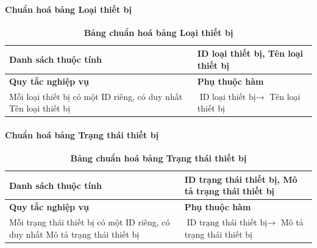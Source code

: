 \cleardoublepage

\paragraph{Chuẩn hoá bảng Loại thiết bị}
\mbox{}
\begin{table}[H]
	\caption{\bfseries \fontsize{12pt}{0pt}\selectfont Bảng chuẩn hoá bảng Loại thiết bị}
	\centering
	\begin{tabularx}{0.9\textwidth}{|X|X|}
		\hline
		\textbf{Danh sách thuộc tính} & ID loại thiết bị, Tên loại thiết bị                                             \\
		\hline
		\textbf{Quy tắc nghiệp vụ}    & \textbf{Phụ thuộc hàm}                                                          \\
		\hline
		Mỗi loại thiết bị có một ID riêng, có duy nhất Tên loại thiết bị
		                              & \parbox[t]{\linewidth}{$\text{ID loại thiết bị} \rightarrow$ Tên loại thiết bị} \\
		\hline
		                                \\
		                                          \\
		\hline
	\end{tabularx}
\end{table}

\paragraph{Chuẩn hoá bảng Trạng thái thiết bị}
\mbox{}
\begin{table}[H]
	\caption{\bfseries \fontsize{12pt}{0pt}\selectfont Bảng chuẩn hoá bảng Trạng thái thiết bị}
	\centering
	\begin{tabularx}{0.9\textwidth}{|X|X|}
		\hline
		\textbf{Danh sách thuộc tính} & ID trạng thái thiết bị, Mô tả trạng thái thiết bị                                             \\
		\hline
		\textbf{Quy tắc nghiệp vụ}    & \textbf{Phụ thuộc hàm}                                                                        \\
		\hline
		Mỗi trạng thái thiết bị có một ID riêng, có duy nhất Mô tả trạng thái thiết bị
		                              & \parbox[t]{\linewidth}{$\text{ID trạng thái thiết bị} \rightarrow$ Mô tả trạng thái thiết bị} \\
		\hline
		                                        \\
		                                                  \\
		\hline
	\end{tabularx}
\end{table}

